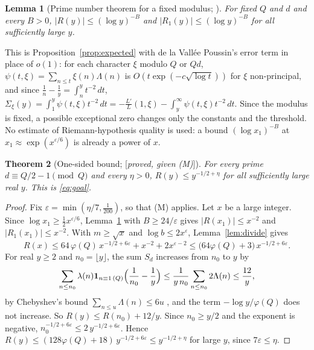 \documentclass[11pt]{amsart}
\numberwithin{equation}{section}
\newtheorem{theorem}{Theorem}[section]
\newtheorem{lemma}[theorem]{Lemma}
\theoremstyle{definition}
\theoremstyle{remark}
\newcommand{\status}[1]{\textup{[\emph{#1}]}}
\begin{document}
\begin{lemma}[Prime number theorem for a fixed modulus; {\cite[Ch.~20]{Davenport}}]\label{lem:pnt}
For fixed $Q$ and $d$ and every $B>0$, $|R(y)|\le(\log y)^{-B}$ and $|R_1(y)|\le(\log y)^{-B}$ for all sufficiently large $y$.
\end{lemma}
This is Proposition~\ref{prop:expected} with de la Vall\'ee Poussin's error term in place of $o(1)$: for each character $\xi$ modulo $Q$ or $Qd$, $\psi(t,\xi)=\sum_{n\le t}\xi(n)\Lambda(n)$ is $O(t\exp(-c\sqrt{\log t}))$ for $\xi$ non-principal, and since $\frac1n-\frac1y=\int_n^yt^{-2}\,dt$, $\Sigma_\xi(y)=\int_1^y\psi(t,\xi)t^{-2}\,dt=-\frac{L'}L(1,\xi)-\int_y^\infty\psi(t,\xi)t^{-2}\,dt$. Since the modulus is fixed, a possible exceptional zero changes only the constants and the threshold. No estimate of Riemann-hypothesis quality is used: a bound $(\log x_1)^{-B}$ at $x_1\approx\exp(x^{\varepsilon/6})$ is already a power of $x$.

\begin{theorem}[One-sided bound; \status{proved, given (M)}]\label{thm:onesided}
For every prime $d\equiv Q/2-1\pmod Q$ and every $\eta>0$, $R(y)\le y^{-1/2+\eta}$ for all sufficiently large real $y$. This is \eqref{eq:goal}.
\end{theorem}
\begin{proof}
Fix $\varepsilon=\min(\eta/7,\frac1{200})$, so that (M) applies. Let $x$ be a large integer. Since $\log x_1\ge\frac12x^{\varepsilon/6}$, Lemma~\ref{lem:pnt} with $B\ge24/\varepsilon$ gives $|R(x_1)|\le x^{-2}$ and $|R_1(x_1)|\le x^{-2}$. With $m\ge\sqrt x$ and $\log b\le2x^\varepsilon$, Lemma~\ref{lem:divide} gives
\begin{equation}
 R(x)\le64\,\varphi(Q)\,x^{-1/2+6\varepsilon}+x^{-2}+2x^{\varepsilon-2}\le\bigl(64\varphi(Q)+3\bigr)\,x^{-1/2+6\varepsilon}.
\end{equation}
For real $y\ge2$ and $n_0=\lfloor y\rfloor$, the sum $S_d$ increases from $n_0$ to $y$ by
\begin{equation}
 \sum_{n\le n_0}\lambda(n)\mathbf 1_{n\equiv1\,(Q)}\Bigl(\frac1{n_0}-\frac1y\Bigr)\le\frac1{y\,n_0}\sum_{n\le n_0}2\Lambda(n)\le\frac{12}y,
\end{equation}
by Chebyshev's bound $\sum_{n\le u}\Lambda(n)\le6u$ {\cite[Ch.~2]{MV}}, and the term $-\log y/\varphi(Q)$ does not increase. So $R(y)\le R(n_0)+12/y$. Since $n_0\ge y/2$ and the exponent is negative, $n_0^{-1/2+6\varepsilon}\le2\,y^{-1/2+6\varepsilon}$. Hence $R(y)\le(128\varphi(Q)+18)\,y^{-1/2+6\varepsilon}\le y^{-1/2+\eta}$ for large $y$, since $7\varepsilon\le\eta$.
\end{proof}
\end{document}
